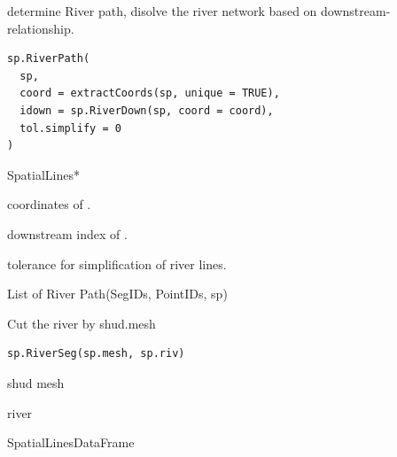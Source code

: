 \documentclass[a4paper]{book}
\begin{document}
%
\begin{Description}\relax
determine River path, disolve the river network based on downstream-relationship.
\end{Description}
%
\begin{Usage}
\begin{verbatim}
sp.RiverPath(
  sp,
  coord = extractCoords(sp, unique = TRUE),
  idown = sp.RiverDown(sp, coord = coord),
  tol.simplify = 0
)
\end{verbatim}
\end{Usage}
%
\begin{Arguments}
\begin{ldescription}
\item[\code{sp}] SpatialLines*

\item[\code{coord}] coordinates of .

\item[\code{idown}] downstream index of .

\item[\code{tol.simplify}] tolerance for simplification of river lines.
\end{ldescription}
\end{Arguments}
%
\begin{Value}
List of River Path(SegIDs, PointIDs, sp)
\end{Value}
%
\begin{Description}\relax
Cut the river by shud.mesh
\end{Description}
%
\begin{Usage}
\begin{verbatim}
sp.RiverSeg(sp.mesh, sp.riv)
\end{verbatim}
\end{Usage}
%
\begin{Arguments}
\begin{ldescription}
\item[\code{sp.mesh}] shud mesh

\item[\code{sp.riv}] river
\end{ldescription}
\end{Arguments}
%
\begin{Value}
SpatialLinesDataFrame
\end{Value}
\end{document}

